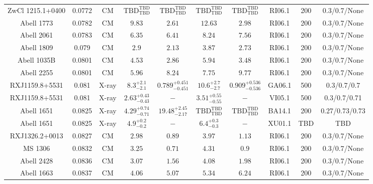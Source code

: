 \begin{table}
\begin{tabular}{cccccccccc}
ZwCl 1215.1+0400 & 0.0772 & CM & ${\mathrm{TBD}}^{\mathrm{TBD}}_{\mathrm{TBD}}$ & ${\mathrm{TBD}}^{\mathrm{TBD}}_{\mathrm{TBD}}$ & ${\mathrm{TBD}}^{\mathrm{TBD}}_{\mathrm{TBD}}$ & ${\mathrm{TBD}}^{\mathrm{TBD}}_{\mathrm{TBD}}$ & RI06.1 & 200 & 0.3/0.7/None \\
Abell 1773 & 0.0782 & CM & ${9.83}^{}_{}$ & ${2.61}^{}_{}$ & ${12.63}^{}_{}$ & ${2.98}^{}_{}$ & RI06.1 & 200 & 0.3/0.7/None \\
Abell 2061 & 0.0783 & CM & ${6.35}^{}_{}$ & ${6.41}^{}_{}$ & ${8.24}^{}_{}$ & ${7.56}^{}_{}$ & RI06.1 & 200 & 0.3/0.7/None \\
Abell 1809 & 0.079 & CM & ${2.9}^{}_{}$ & ${2.13}^{}_{}$ & ${3.87}^{}_{}$ & ${2.73}^{}_{}$ & RI06.1 & 200 & 0.3/0.7/None \\
Abell 1035B & 0.0801 & CM & ${4.53}^{}_{}$ & ${2.86}^{}_{}$ & ${5.94}^{}_{}$ & ${3.48}^{}_{}$ & RI06.1 & 200 & 0.3/0.7/None \\
Abell 2255 & 0.0801 & CM & ${5.96}^{}_{}$ & ${8.24}^{}_{}$ & ${7.75}^{}_{}$ & ${9.77}^{}_{}$ & RI06.1 & 200 & 0.3/0.7/None \\
RXJ1159.8+5531 & 0.081 & X-ray & ${8.3}^{+2.1}_{-2.1}$ & ${0.789}^{+0.451}_{-0.451}$ & ${10.6}^{+2.7}_{-2.7}$ & ${0.909}^{+0.536}_{-0.536}$ & GA06.1 & 500 & 0.3/0.7/0.7 \\
RXJ1159.8+5531 & 0.081 & X-ray & ${2.63}^{+0.43}_{-0.43}$ & ${-}^{}_{}$ & ${3.51}^{+0.55}_{-0.55}$ & ${-}^{}_{}$ & VI05.1 & 500 & 0.3/0.7/0.71 \\
Abell 1651 & 0.0825 & X-ray & ${4.29}^{+0.74}_{-0.71}$ & ${19.48}^{+2.45}_{-2.17}$ & ${\mathrm{TBD}}^{\mathrm{TBD}}_{\mathrm{TBD}}$ & ${\mathrm{TBD}}^{\mathrm{TBD}}_{\mathrm{TBD}}$ & BA14.1 & 200 & 0.27/0.73/0.73 \\
Abell 1651 & 0.0825 & X-ray & ${4.9}^{+0.2}_{-0.2}$ & ${-}^{}_{}$ & ${6.4}^{+0.3}_{-0.3}$ & ${-}^{}_{}$ & XU01.1 & TBD & TBD \\
RXJ1326.2+0013 & 0.0827 & CM & ${2.98}^{}_{}$ & ${0.89}^{}_{}$ & ${3.97}^{}_{}$ & ${1.13}^{}_{}$ & RI06.1 & 200 & 0.3/0.7/None \\
MS 1306 & 0.0832 & CM & ${3.25}^{}_{}$ & ${0.71}^{}_{}$ & ${4.31}^{}_{}$ & ${0.9}^{}_{}$ & RI06.1 & 200 & 0.3/0.7/None \\
Abell 2428 & 0.0836 & CM & ${3.07}^{}_{}$ & ${1.56}^{}_{}$ & ${4.08}^{}_{}$ & ${1.98}^{}_{}$ & RI06.1 & 200 & 0.3/0.7/None \\
Abell 1663 & 0.0837 & CM & ${4.06}^{}_{}$ & ${5.07}^{}_{}$ & ${5.34}^{}_{}$ & ${6.24}^{}_{}$ & RI06.1 & 200 & 0.3/0.7/None \\

\end{tabular}
\end{table}

